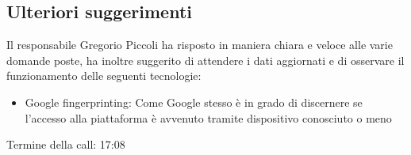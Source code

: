 \subsection{Ulteriori suggerimenti}

Il responsabile Gregorio Piccoli ha risposto in maniera chiara e veloce alle varie domande poste, ha inoltre suggerito di attendere i dati aggiornati e di osservare il funzionamento delle seguenti tecnologie:

\begin{itemize}
		\item Google fingerprinting: Come Google stesso è in grado di discernere se l'accesso alla piattaforma è avvenuto tramite dispositivo conosciuto o meno
\end{itemize}


\noindent
Termine della call: 17:08
